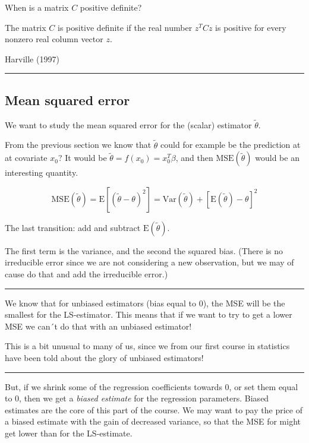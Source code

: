 \documentclass[
  letterpaper,
  DIV=11,
  numbers=noendperiod]{scrartcl}
\begin{document}
When is a matrix \(C\) positive definite?

The matrix \(C\) is positive definite if the real number \(z^T C z\) is
positive for every nonzero real column vector \(z\).

Harville (1997)

\begin{center}\rule{0.5\linewidth}{0.5pt}\end{center}

\hypertarget{mean-squared-error}{%
\subsection{Mean squared error}\label{mean-squared-error}}

We want to study the mean squared error for the (scalar) estimator
\(\tilde{\theta}\).

From the previous section we know that \(\tilde{\theta}\) could for
example be the prediction at at covariate \(x_0\)? It would be
\(\tilde{\theta}=f(x_0)=x_0^T \beta\), and then
\(\text{MSE}(\tilde{\theta})\) would be an interesting quantity.

\[\text{MSE}(\tilde{\theta})= \text{E}[(\tilde{\theta}-\theta)^2]=\text{Var}(\tilde{\theta})+[\text{E}(\tilde{\theta})-\theta]^2\]

The last transition: add and subtract \(\text{E}(\tilde{\theta})\).

The first term is the variance, and the second the squared bias. (There
is no irreducible error since we are not considering a new observation,
but we may of cause do that and add the irreducible error.)

\begin{center}\rule{0.5\linewidth}{0.5pt}\end{center}

We know that for unbiased estimators (bias equal to \(0\)), the MSE will
be the smallest for the LS-estimator. This means that if we want to try
to get a lower MSE we can´t do that with an unbiased estimator!

This is a bit unusual to many of us, since we from our first course in
statistics have been told about the glory of unbiased estimators!

\begin{center}\rule{0.5\linewidth}{0.5pt}\end{center}

But, if we shrink some of the regression coefficients towards 0, or set
them equal to 0, then we get a \emph{biased estimate} for the regression
parameters. Biased estimates are the core of this part of the course. We
may want to pay the price of a biased estimate with the gain of
decreased variance, so that the MSE for might get lower than for the
LS-estimate.
\end{document}

